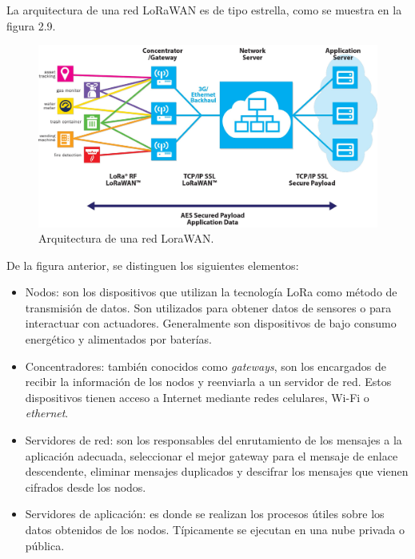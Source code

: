 
La arquitectura de una red LoRaWAN es de tipo estrella, como se muestra en la figura 2.9.

\begin{figure}[h]
	\centering
	\includegraphics[scale=0.17]{./Figures/lorawan_architecture.jpg}
	\caption{Arquitectura de una red LoraWAN\protect\footnotemark.}
	\label{fig:cuadradoAzul}
\end{figure}


De la figura anterior, se distinguen los siguientes elementos:

\begin{itemize}
	\item Nodos: son los dispositivos que utilizan la tecnología LoRa como método de transmisión de datos. Son utilizados para obtener datos de sensores o para interactuar con actuadores. Generalmente son dispositivos de bajo consumo energético y alimentados por baterías.
	\item Concentradores: también conocidos como \textit{gateways}, son los encargados de recibir la información de los nodos y reenviarla a un servidor de red. Estos dispositivos tienen acceso a Internet mediante redes celulares, Wi-Fi o \textit{ethernet}.
	\item Servidores de red: son los responsables del enrutamiento de los mensajes a la aplicación adecuada, seleccionar el mejor gateway para el mensaje de enlace descendente, eliminar mensajes duplicados y descifrar los mensajes que vienen cifrados desde los nodos.
	\item Servidores de aplicación: es donde se realizan los procesos útiles sobre los datos obtenidos de los nodos. Típicamente se ejecutan en una nube privada o pública.
\end{itemize}

